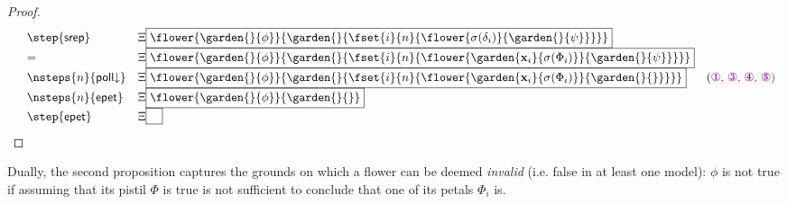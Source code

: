 \begin{proof}
$$\begin{array}{rlll}
    &\step{\mathsf{srep}} &\cfill{\Xi}{\flower{\garden{{}}{\phi}}{\garden{{}}{\fset{i}{n}{\flower{\sigma(\delta_i)}{\garden{{}}{\psi}}}}}} & \\
    &= &\cfill{\Xi}{\flower{\garden{{}}{\phi}}{\garden{{}}{\fset{i}{n}{\flower{\garden{\bx_i}{\sigma(\Phi_i)}}{\garden{{}}{\psi}}}}}} & \\
    &\nsteps{n}{\mathsf{poll}{\da}} &\cfill{\Xi}{\flower{\garden{{}}{\phi}}{\garden{{}}{\fset{i}{n}{\flower{\garden{\bx_i}{\sigma(\Phi_i)}}{\garden{{}}{{}}}}}}} &\text{(\HOne, \HThree, \HFour, \HFive)} \\
    &\nsteps{n}{\mathsf{epet}} &\cfill{\Xi}{\flower{\garden{{}}{\phi}}{\garden{{}}{{}}}} & \\
    &\step{\mathsf{epet}} &\cfill{\Xi}{\phantom{\Phi}} &
  \end{array}
  $$
\end{proof}

Dually, the second proposition captures the grounds on which a flower can be
deemed \emph{invalid} (i.e. false in at least one model): $\phi$ is not true if
assuming that its pistil $\Phi$ is true is not sufficient to conclude that one
of its petals $\Phi_i$ is.

